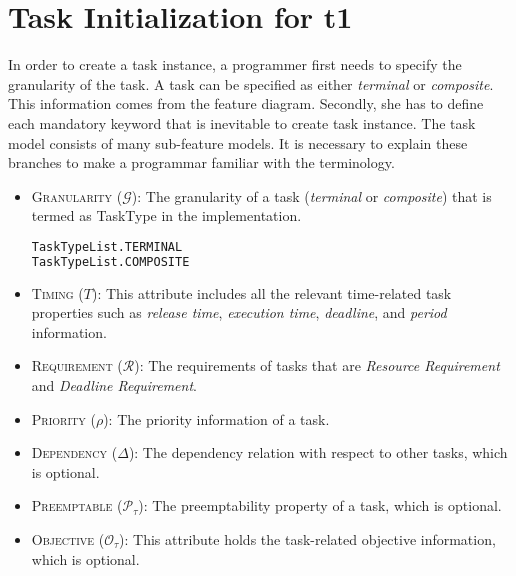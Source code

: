 \documentclass[]{scrartcl}
\begin{document}
            
\section{Task Initialization for \textsf{t1}}
        
In order to create a task instance, a programmer first needs to specify the granularity of the task. A task can be specified as either \emph{terminal} or \emph{composite}. This information comes from the feature diagram.
Secondly, she has to define each mandatory keyword that is inevitable to create task instance. The task model consists of many sub-feature models. It is necessary to explain these branches to make a programmar familiar with
the terminology.
\begin{itemize}
    \item \textsc{Granularity} ($\mathcal{G}$): The granularity of a task (\emph{terminal} or \emph{composite}) that is termed as \textsf{TaskType} in the implementation.

\begin{lstlisting}[language=Python, frame=single, label={lst:TaskTypeListt1}, caption={The enumeration of the type of tasks.}]
TaskTypeList.TERMINAL
TaskTypeList.COMPOSITE
\end{lstlisting}
        
    \item \textsc{Timing} ($T$): This attribute includes all the relevant time-related task properties such as \emph{release time}, \emph{execution time}, \emph{deadline}, and \emph{period} information.
    \item \textsc{Requirement} ($\mathcal{R}$): The requirements of tasks that are \emph{Resource Requirement} and \emph{Deadline Requirement}.
    \item \textsc{Priority} ($\rho$): The priority information of a task.
    \item \textsc{Dependency} ($\Delta$): The dependency relation with respect to other tasks, which is optional.
    \item \textsc{Preemptable} ($\mathcal{P}_\tau$): The preemptability property of a task, which is optional.
    \item \textsc{Objective} ($\mathcal{O}_{\tau}$): This attribute holds the task-related objective information, which is optional.
\end{itemize}
\end{document}
